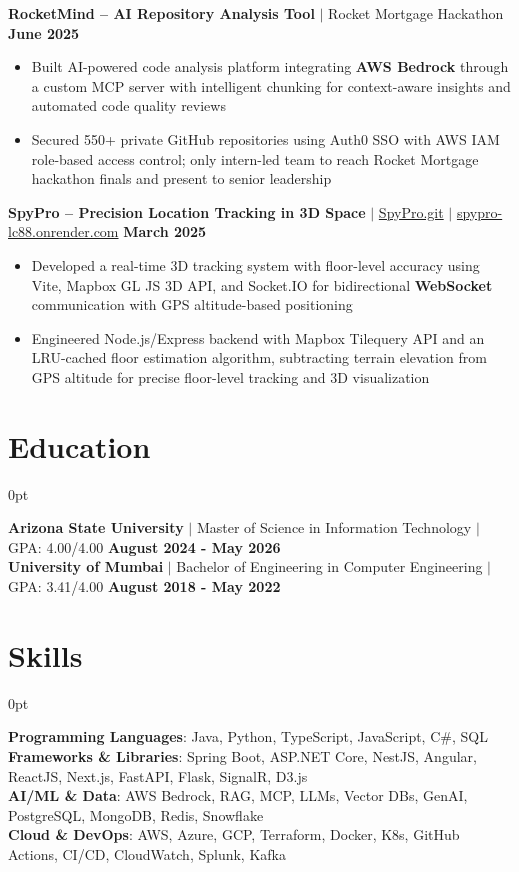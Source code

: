 \documentclass[letterpaper,10pt]{article}
\newlength{\contentindent}
\newcommand{\sectioncontent}[1]{%
  \begin{adjustwidth}{\contentindent}{0pt}%
  #1%
  \end{adjustwidth}%
}
\begin{document}
{\textbf{RocketMind -- AI Repository Analysis Tool} $|$
Rocket Mortgage Hackathon \hfill \textbf{June 2025}
\begin{itemize}
    \item Built AI-powered code analysis platform integrating \textbf{AWS Bedrock} through a custom MCP server with intelligent chunking for context-aware insights and automated code quality reviews
    \item Secured 550+ private GitHub repositories using Auth0 SSO with AWS IAM role-based access control; only intern-led team to reach Rocket Mortgage hackathon finals and present to senior leadership
\end{itemize}

\textbf{SpyPro -- Precision Location Tracking in 3D Space} $|$
\href{https://github.com/Saurav-Kalaskar/SpyPro}{SpyPro.git} $|$
\href{https://spypro-lc88.onrender.com}{spypro-lc88.onrender.com} \hfill \textbf{March 2025}
\begin{itemize}
    \item Developed a real-time 3D tracking system with floor-level accuracy using Vite, Mapbox GL JS 3D API, and Socket.IO for bidirectional \textbf{WebSocket} communication with GPS altitude-based positioning
    \item Engineered Node.js/Express backend with Mapbox Tilequery API and an LRU-cached floor estimation algorithm, subtracting terrain elevation from GPS altitude for precise floor-level tracking and 3D visualization
\end{itemize}
}

\section{Education}
\sectioncontent{
\textbf{Arizona State University} $|$
Master of Science in Information Technology $|$
GPA: 4.00/4.00 \hfill \textbf{August 2024 - May 2026}
\\[2pt]
\textbf{University of Mumbai} $|$
Bachelor of Engineering in Computer Engineering $|$
GPA: 3.41/4.00 \hfill \textbf{August 2018 - May 2022}
\\[2pt]
}

\section{Skills}
\sectioncontent{
\textbf{Programming Languages}: Java, Python, TypeScript, JavaScript, C\#, SQL\\
\textbf{Frameworks \& Libraries}: Spring Boot, ASP.NET Core, NestJS, Angular, ReactJS, Next.js, FastAPI, Flask, SignalR, D3.js\\
\textbf{AI/ML \& Data}: AWS Bedrock, RAG, MCP, LLMs, Vector DBs, GenAI, PostgreSQL, MongoDB, Redis, Snowflake\\
\textbf{Cloud \& DevOps}: AWS, Azure, GCP, Terraform, Docker, K8s, GitHub Actions, CI/CD, CloudWatch, Splunk, Kafka\\
}
\end{document}
